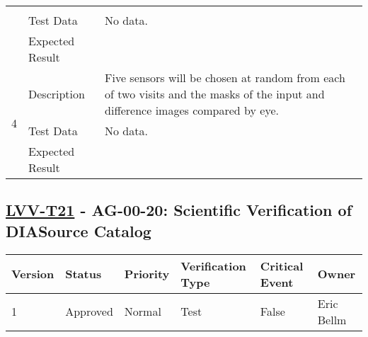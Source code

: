 \begin{longtable}[]{p{1.3cm}p{2cm}p{13cm}}
\begin{minipage}[t]{13cm}
{            \vspace{\dp0}
            } \end{minipage} \\ \cline{2-3}
            & Test Data &
            \begin{minipage}[t]{13cm}{\footnotesize
                No data.
                \vspace{\dp0}
            } \end{minipage} \\ \cline{2-3}
            & Expected Result &
        \\ \midrule

            \multirow{3}{*}{ 4 } & Description &
            \begin{minipage}[t]{13cm}{\footnotesize
            Five sensors will be chosen at random from each of two visits and the
masks of the input and difference images compared by eye.

            \vspace{\dp0}
            } \end{minipage} \\ \cline{2-3}
            & Test Data &
            \begin{minipage}[t]{13cm}{\footnotesize
                No data.
                \vspace{\dp0}
            } \end{minipage} \\ \cline{2-3}
            & Expected Result &
        \\ \midrule
    \end{longtable}

\subsection{\href{https://jira.lsstcorp.org/secure/Tests.jspa\#/testCase/LVV-T21}{LVV-T21}
    - AG-00-20: Scientific Verification of DIASource Catalog}\label{lvv-t21}

\begin{longtable}[]{llllll}
\toprule
Version & Status & Priority & Verification Type & Critical Event & Owner
\\\midrule
1 & Approved & Normal &
Test & False & Eric Bellm
\\\bottomrule
\end{longtable}

